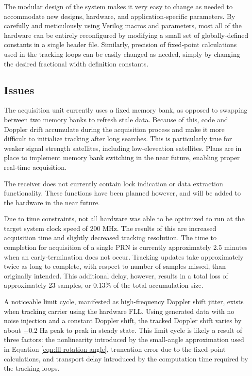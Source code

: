 \documentclass[12pt]{article}
\begin{document}
The modular design of the system makes it very easy to change as needed to accommodate new designs, hardware, and application-specific parameters. By carefully and meticulously using Verilog macros and parameters, most all of the hardware can be entirely reconfigured by modifying a small set of globally-defined constants in a single header file. Similarly, precision of fixed-point calculations used in the tracking loops can be easily changed as needed, simply by changing the desired fractional width definition constants.

\subsection{Issues}
The acquisition unit currently uses a fixed memory bank, as opposed to swapping between two memory banks to refresh stale data. Because of this, code and Doppler drift accumulate during the acquisition process and make it more difficult to initialize tracking after long searches. This is particularly true for weaker signal strength satellites, including low-eleveation satellites. Plans are in place to implement memory bank switching in the near future, enabling proper real-time acquisition.

The receiver does not currently contain lock indication or data extraction functionality. These functions have been planned however, and will be added to the hardware in the near future.

Due to time constraints, not all hardware was able to be optimized to run at the target system clock speed of 200 MHz. The results of this are increased acquisition time and slightly decreased tracking resolution. The time to completion for acquisition of a single PRN is currently approximately 2.5 minutes when an early-termination does not occur. Tracking updates take approximately twice as long to complete, with respect to number of samples missed, than originally intended. This additional delay, however, results in a total loss of approximately 23 samples, or 0.13\% of the total accumulation size.

A noticeable limit cycle, manifested as high-frequency Doppler shift jitter, exists when tracking carrier using the hardware FLL. Using generated data with no noise injection and a constant Doppler shift, the tracked Doppler shift varies by about $\pm 0.2$ Hz peak to peak in steady state. This limit cycle is likely a result of three factors: the nonlinearity introduced by the small-angle approximation used in Equation \ref{eqn:fll rotation angle}, truncation error due to the fixed-point calculations, and transport delay introduced by the computation time required by the tracking loops.
\end{document}
